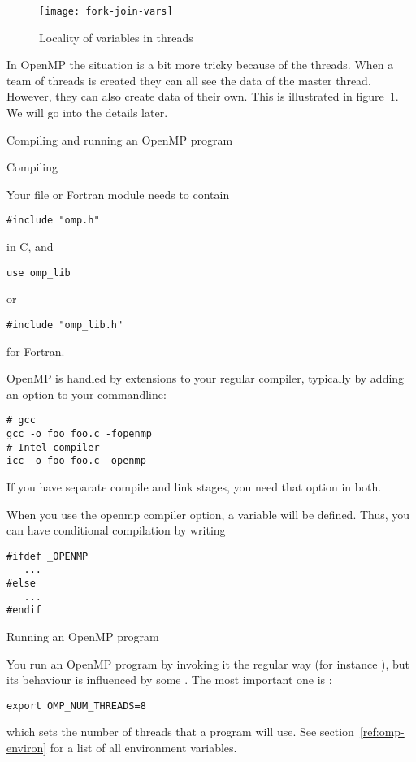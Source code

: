 \begin{figure}[ht]
\texttt{[image: fork-join-vars]}
\caption{Locality of variables in threads}
\label{fig:threadvars}
\end{figure}
%
In OpenMP the situation is a bit more tricky because of the threads.
When a team of threads is created they can all see the data of the
master thread. However, they can also create data of their own.
This is illustrated in figure~\ref{fig:threadvars}.
We will go into the details later.

 {Compiling and running an OpenMP program}

 {Compiling}

Your file or Fortran module needs to contain
\begin{verbatim}
#include "omp.h"
\end{verbatim}
in C, and 
\begin{verbatim}
use omp_lib
\end{verbatim}
or
\begin{verbatim}
#include "omp_lib.h"
\end{verbatim}
for Fortran.

OpenMP is handled by extensions to your regular compiler, typically by
adding an option to your commandline:
\begin{verbatim}
# gcc
gcc -o foo foo.c -fopenmp
# Intel compiler
icc -o foo foo.c -openmp
\end{verbatim}
If you have separate compile and link stages, you need that option in both.

When you use the openmp compiler option, a  variable 
will be defined. Thus, you can have conditional compilation by writing
\begin{verbatim}
#ifdef _OPENMP
   ...
#else
   ...
#endif
\end{verbatim}


 {Running an OpenMP program}

You run an OpenMP program by invoking it the regular way (for instance ),
but its behaviour is influenced by some .
The most important one is :
\begin{verbatim}
export OMP_NUM_THREADS=8
\end{verbatim}
which sets the number of threads that a program will use.
See section~\ref{ref:omp-environ} for a list of all environment variables.

